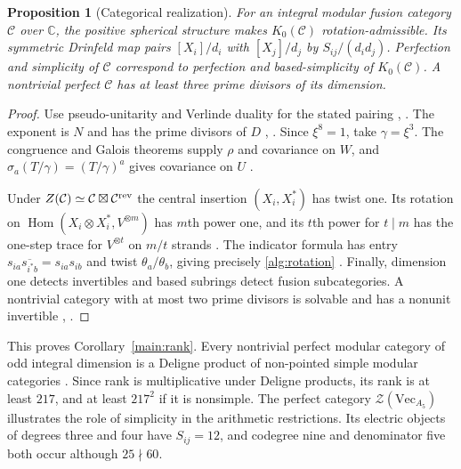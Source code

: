 \documentclass[11pt]{amsart}
\numberwithin{equation}{section}
\newtheorem{proposition}[theorem]{Proposition}
\theoremstyle{definition}
\theoremstyle{plain}
\newcommand{\C}{\mathcal C}
\begin{document}
\begin{proposition}[Categorical realization]\label{alg:realization}\label{cat:realization-section}
For an integral modular fusion category $\C$ over $\mathbb C$, the
positive spherical structure makes $K_0(\C)$ rotation-admissible. Its
symmetric Drinfeld map pairs $[X_i]/d_i$ with $[X_j]/d_j$ by
$S_{ij}/(d_i d_j)$. Perfection and simplicity of $\C$ correspond to
perfection and based-simplicity of $K_0(\C)$. A nontrivial perfect
$\C$ has at least three prime divisors of its dimension.
\end{proposition}
\begin{proof}
Use pseudo-unitarity \cite[Propositions~8.23--8.24]{ENOannals} and
Verlinde duality for the stated pairing
\cite[\S8.14]{EGNO}, \cite[\S10]{BPBurnside}. The exponent is $N$ and has
the prime divisors of $D$ \cite[Theorem~7.7]{NSfs},
\cite[Theorem~3.9]{BNRWFinite}. Since $\xi^8=1$, take $\gamma=\xi^3$.
The congruence and Galois theorems supply $\rho$ and covariance on $W$,
and $\sigma_a(T/\gamma)=(T/\gamma)^a$ gives covariance on $U$
\cite[Theorem~II, Remark~4.5 and Proposition~6.7]{DLNCongruence}.

Under $Z(\C)\simeq\C\boxtimes\C^{\rm rev}$ the central insertion
$(X_i,X_i^*)$ has twist one. Its rotation on
$\operatorname{Hom}(X_i\otimes X_i^*,V^{\otimes m})$ has $m$th power
one, and its $t$th power for $t\mid m$ has the one-step trace for
$V^{\otimes t}$ on $m/t$ strands \cite[Lemmas~2.5, 2.7 and Proposition~2.8]{NSind}.
The indicator formula has entry $s_{ia}\overline{s_{i^*b}}=s_{ia}s_{ib}$
and twist $\theta_a/\theta_b$, giving precisely \eqref{alg:rotation}
\cite[Corollary~5.6 and Propositions~5.7, 6.1]{NSind}.
Finally, dimension one detects invertibles and based subrings detect
fusion subcategories. A nontrivial category with at most two prime
divisors is solvable and has a nonunit invertible
\cite[Theorem~1.6 and Proposition~4.5(iv)]{ENOWGT}, \cite[Proposition~5.2]{ABPP}.
\end{proof}

This proves Corollary~\ref{main:rank}. Every nontrivial perfect modular
category of odd integral dimension is a Deligne product of non-pointed
simple modular categories \cite[Corollary~4.2 and Remark~4.3]{CPodd}.
Since rank is multiplicative under Deligne products, its rank is at least
$217$, and at least $217^2$ if it is nonsimple. The perfect category
$\mathcal Z(\mathrm{Vec}_{A_5})$ illustrates the role of simplicity in
the arithmetic restrictions. Its electric objects of degrees three
and four have $S_{ij}=12$, and codegree nine and denominator five both
occur although $25\nmid60$.
\end{document}

